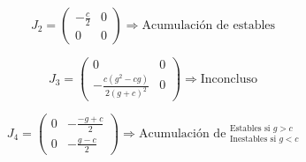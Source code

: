 \documentclass[twocolumn,aps,prl]{revtex4-1}
\begin{document}


$$J_2=
\begin{pmatrix}
    -\frac{c}{2}
    &
    0
    \\  
    0
    &
    0
\end{pmatrix}
\Rightarrow \text{Acumulación de estables} 
$$


$$J_3 =
\begin{pmatrix}
    0
    &
    0
    \\  
    -\frac{c\left(g^2-cg\right)}{2\left(g+c\right)^2}
    &
    0
\end{pmatrix}
\Rightarrow \text{Inconcluso}
$$




$$J_4 =
\begin{pmatrix}
    0
    &
    -\frac{-g+c}{2}
    \\  
    0
    &
    -\frac{g-c}{2}
\end{pmatrix}
\Rightarrow \text{Acumulación de } ^{\text{Estables si } g>c}_{\text{Inestables si } g<c}
$$
\end{document}
